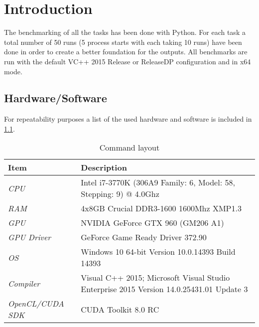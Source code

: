 \documentclass[final]{report}
\begin{document}
\chapter{Introduction}
The benchmarking of all the tasks has been done with Python.
For each task a total number of 50 runs (5 process starts with each taking 10 runs) have been done in order to create a better foundation for the outputs.
All benchmarks are run with the default VC++ 2015 Release or ReleaseDP configuration and in x64 mode.

\section{Hardware/Software}
For repeatability purposes a list of the used hardware and software is included in \cref{tab:hardware-software}.

\begin{table}[H]
\centering
\caption{Command layout}
\label{tab:hardware-software}
\begin{tabular}{lp{9cm}}
\toprule
\textbf{Item} & \textbf{Description} \\
\midrule
\textit{CPU} & Intel i7-3770K (306A9 Family: 6, Model: 58, Stepping: 9) @ 4.0Ghz\\
\textit{RAM} & 4x8GB Crucial DDR3-1600 1600Mhz XMP1.3\\
\textit{GPU} & NVIDIA GeForce GTX 960 (GM206 A1)\\
\textit{GPU Driver} & GeForce Game Ready Driver 372.90\\
\textit{OS} & Windows 10 64-bit Version 10.0.14393 Build 14393\\
\textit{Compiler} & Visual C++ 2015; Microsoft Visual Studio Enterprise 2015 Version 14.0.25431.01 Update 3\\
\textit{OpenCL/CUDA SDK} & CUDA Toolkit 8.0 RC\\
\bottomrule
\end{tabular}
\end{table}
\end{document}

